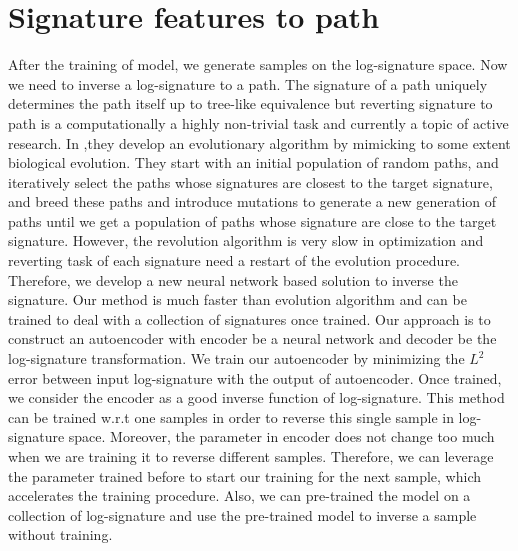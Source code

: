 \documentclass[12pt]{report}
\theoremstyle{definition}
\theoremstyle{remark}
\begin{document}
\section{Signature features to path}
After the training of model, we generate samples on the log-signature space. Now we need to inverse a log-signature to a path. The signature of a path uniquely determines the path itself up to tree-like equivalence but reverting signature to path is a computationally a highly non-trivial task and currently a topic of active research. In ,they develop an evolutionary algorithm by mimicking to some extent biological evolution. They start with an initial population of random paths, and iteratively select the paths whose signatures are closest to the target signature, and breed these paths and introduce mutations to generate a new generation of paths until we get a population of paths whose signature are close to the target signature. However, the revolution algorithm is very slow in optimization and reverting task of each signature need a restart of the evolution procedure. Therefore, we develop a new neural network based solution to inverse the signature. Our method is much faster than evolution algorithm and can be trained to deal with a collection of signatures once trained. Our approach is to construct an autoencoder with encoder be a neural network and decoder be the log-signature transformation. We train our autoencoder by minimizing the $L^{2}$ error between input log-signature with the output of autoencoder. Once trained, we consider the encoder as a good inverse function of log-signature. This method can be trained w.r.t one samples in order to reverse this single sample in log-signature space. Moreover, the parameter in encoder does not change too much when we are training it to reverse different samples. Therefore, we can leverage the parameter trained before to start our training for the next sample, which accelerates the training procedure. Also, we can pre-trained the model on a collection of log-signature and use the pre-trained model to inverse a sample without training.  
\end{document}
